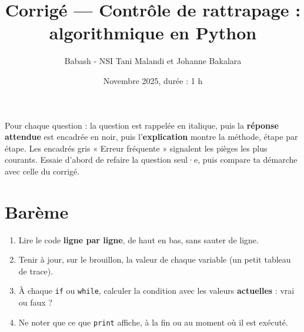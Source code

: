 \documentclass[addpoints, 11pt]{exam}
\title{Corrigé --- Contrôle de rattrapage : algorithmique en Python}
\author{Babash - NSI Tani Malandi et Johanne Bakalara}
\date{Novembre 2025, durée : 1 h}
\newcommand{\code}[1]{\texttt{#1}}
\DeclareRobustCommand{\_}{\textunderscore\allowbreak}
\begin{document}
\pagestyle{headandfoot}
\firstpageheader{}{}{}

\maketitle
\thispagestyle{headandfoot}

\begin{astuce}
Pour chaque question : la question est rappelée en italique, puis la \textbf{réponse attendue} est encadrée en noir, puis l'\textbf{explication} montre la méthode, étape par étape.
Les encadrés gris « Erreur fréquente » signalent les pièges les plus courants. Essaie d'abord de refaire la question seul·e, puis compare ta démarche avec celle du corrigé.
\end{astuce}

\section*{Barème}
\begin{center}
  \gradetable[h][questions]
\end{center}

\begin{astuce}
\begin{enumerate}
  \item Lire le code \textbf{ligne par ligne}, de haut en bas, sans sauter de ligne.
  \item Tenir à jour, sur le brouillon, la valeur de chaque variable (un petit tableau de trace).
  \item À chaque \code{if} ou \code{while}, calculer la condition avec les valeurs \textbf{actuelles} : vrai ou faux ?
  \item Ne noter que ce que \code{print} affiche, à la fin ou au moment où il est exécuté.
\end{enumerate}
\end{astuce}
\end{document}
